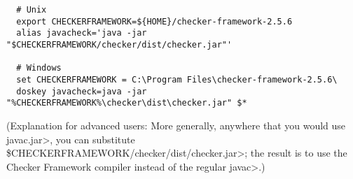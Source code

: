 \begin{itemize}
\begin{Verbatim}
  # Unix
  export CHECKERFRAMEWORK=${HOME}/checker-framework-2.5.6
  alias javacheck='java -jar "$CHECKERFRAMEWORK/checker/dist/checker.jar"'

  # Windows
  set CHECKERFRAMEWORK = C:\Program Files\checker-framework-2.5.6\
  doskey javacheck=java -jar "%CHECKERFRAMEWORK%\checker\dist\checker.jar" $*
\end{Verbatim}

   (Explanation for advanced users:  More generally, anywhere that you would use \<javac.jar>, you can substitute
   \<\$CHECKERFRAMEWORK/checker/dist/checker.jar>;
   the result is to use the Checker
   Framework compiler instead of the regular \<javac>.)

\end{itemize}



%
%
%
%
%
%
%
%
%


